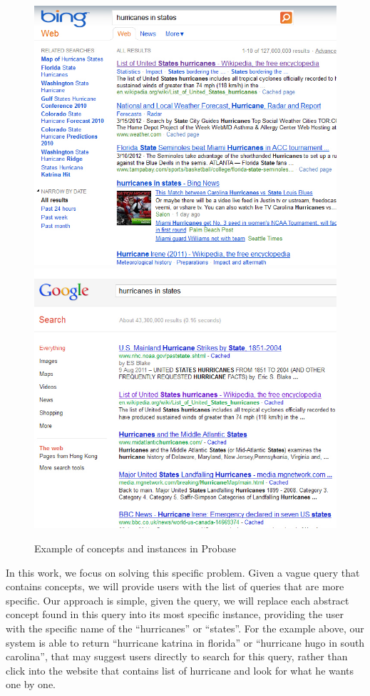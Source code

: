 \begin{figure}[h]
\centering
\includegraphics[scale=0.35]{images/hurricaneinstates-bing}
\includegraphics[scale=0.35]{images/hurricaneinstates-google}
\caption{Example of concepts and instances in Probase}
\label{fig:exampleGoogleBing}
\end{figure}

In this work, we focus on solving this specific problem. Given 
a vague query that contains concepts, we will provide users with 
the list of queries that are more specific. Our approach is 
simple, given the query, we will replace each abstract concept 
found in this query into its most specific instance, providing 
the user with the specific name of the ``hurricanes'' or ``states''. 
For the example above, our system is able to return 
``hurricane katrina in florida'' or ``hurricane hugo in south carolina'', 
that may suggest users directly to search for this query, rather than 
click into the website that contains list of hurricane and look for 
what he wants one by one.

